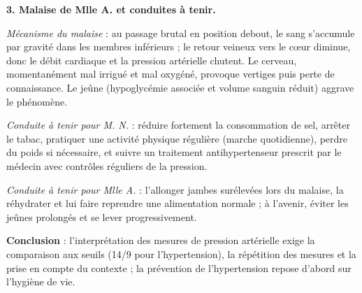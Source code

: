 \documentclass[11pt]{article}
\begin{document}
\begin{exoresolu}
\textbf{3. Malaise de Mlle A. et conduites à tenir.}

\emph{Mécanisme du malaise} : au passage brutal en position debout, le sang s'accumule par gravité dans les membres inférieurs ; le retour veineux vers le c\oe ur diminue, donc le débit cardiaque et la pression artérielle chutent. Le cerveau, momentanément mal irrigué et mal oxygéné, provoque vertiges puis perte de connaissance. Le jeûne (hypoglycémie associée et volume sanguin réduit) aggrave le phénomène.

\emph{Conduite à tenir pour M. N.} : réduire fortement la consommation de sel, arrêter le tabac, pratiquer une activité physique régulière (marche quotidienne), perdre du poids si nécessaire, et suivre un traitement antihypertenseur prescrit par le médecin avec contrôles réguliers de la pression.

\emph{Conduite à tenir pour Mlle A.} : l'allonger jambes surélevées lors du malaise, la réhydrater et lui faire reprendre une alimentation normale ; à l'avenir, éviter les jeûnes prolongés et se lever progressivement.

\textbf{Conclusion} : l'interprétation des mesures de pression artérielle exige la comparaison aux seuils (14/9 pour l'hypertension), la répétition des mesures et la prise en compte du contexte ; la prévention de l'hypertension repose d'abord sur l'hygiène de vie.
\end{exoresolu}
\end{document}
